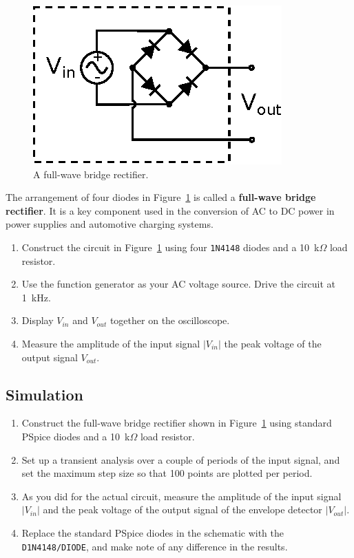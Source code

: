 \documentclass[11pt]{article}
\begin{document}
\begin{figure}[h]
\centering
\includegraphics{bridgerectifier.eps}
\caption{A full-wave bridge rectifier.}
\label{fig:bridgerectifier}
\end{figure}
The arrangement of four diodes in Figure~\ref{fig:bridgerectifier} is
called a \textbf{full-wave bridge rectifier}. It is a key component
used in the conversion of AC to DC power in power supplies and
automotive charging systems. 

\begin{enumerate}
\item Construct the circuit in
  Figure~\ref{fig:bridgerectifier} using four \texttt{1N4148} diodes
  and a 10~k$\Omega$ load resistor.

\item Use the function generator as your AC voltage source. Drive the
  circuit at 1~kHz. 
  
\item Display $V_{in}$ and $V_{out}$ together on the oscilloscope.

\item Measure the amplitude of the input signal $|V_{in}|$ the peak
  voltage of the output signal $V_{out}$.
\end{enumerate}

\subsection*{Simulation}

\begin{enumerate}
\item Construct the full-wave bridge rectifier shown in
  Figure~\ref{fig:bridgerectifier} using standard PSpice diodes
  and a 10~k$\Omega$ load resistor.

\item Set up a transient analysis over a couple of periods of the
  input signal, and set the maximum step size so that 100
  points are plotted per period.

\item As you did for the actual circuit, measure the amplitude of the
  input signal $|V_{in}|$ and the peak voltage of the output signal of
  the envelope detector $|V_{out}|$.

\item Replace the standard PSpice diodes in the schematic with the
  \texttt{D1N4148/DIODE}, and make note of any difference in the
  results.
\end{enumerate}
\end{document}
